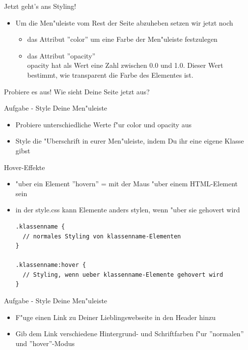 \documentclass[18pt]{beamer}
\begin{document}
\begin{frame}[fragile]{Jetzt geht's ans Styling!}
\begin{itemize}
\item Um die Men"uleiste vom Rest der Seite abzuheben setzen wir jetzt noch
\begin{itemize}
\item das Attribut ''color'' um eine Farbe der Men"uleiste festzulegen
\item das Attribut ''opacity'' \\
opacity hat als Wert eine Zahl zwischen 0.0  und 1.0. Dieser Wert bestimmt, wie transparent die Farbe des Elementes ist. 
\end{itemize}
\end{itemize}
\pause
Probiere es aus! Wie sieht Deine Seite jetzt aus?
\end{frame}

\begin{frame}[fragile]{Aufgabe - Style Deine Men"uleiste}
\begin{itemize}
\item Probiere unterschiedliche Werte f"ur color und opacity aus
\item Style die "Uberschrift in eurer Men"uleiste, indem Du ihr eine eigene Klasse gibst
\end{itemize}
\end{frame}

\begin{frame}[fragile]{Hover-Effekte}
\begin {itemize}
\item "uber ein Element ''hovern'' = mit der Maus "uber einem HTML-Element sein
\item in der style.css kann Elemente anders stylen, wenn "uber sie gehovert wird
\begin{lstlisting}
.klassenname {
  // normales Styling von klassenname-Elementen
}

.klassenname:hover {
  // Styling, wenn ueber klassenname-Elemente gehovert wird
}
\end{lstlisting}
\end{itemize}
\end{frame}

\begin{frame}[fragile]{Aufgabe - Style Deine Men"uleiste}
\begin{itemize}
\item F"uge einen Link zu Deiner Lieblingswebseite in den Header hinzu
\item Gib dem Link verschiedene Hintergrund- und Schriftfarben f"ur ''normalen'' und ''hover''-Modus
\end{itemize}
\end{frame}
\end{document}
